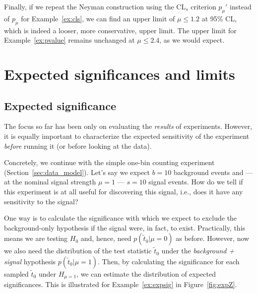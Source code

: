 Finally, if we repeat the Neyman construction using the CL$_s$ criterion $p_\mu'$ instead of $p_\mu$ for Example~\ref{ex:cls}, we can find an upper limit of $\mu \leq 1.2$ at 95\% CL, which is indeed a looser, more conservative, upper limit.
The upper limit for Example~\ref{ex:pvalue} remains unchanged at $\mu \leq 2.4$, as we would expect.


\chapter{Expected significances and limits}
\label{sec:expected}

\section{Expected significance}

The focus so far has been only on evaluating the \textit{results} of experiments.
However, it is equally important to characterize the expected sensitivity of the experiment \textit{before} running it (or before looking at the data).

\begin{example}
\label{ex:expsig}
Concretely, we continue with the simple one-bin counting experiment (Section~\ref{sec:data_model}).
Let's say we expect $b = 10$ background events and --- at the nominal signal strength $\mu = 1$ --- $s = 10$ signal events.
How do we tell if this experiment is at all useful for discovering this signal, i.e., does it have any sensitivity to the signal?
\end{example}

One way is to calculate the significance with which we expect to exclude the background-only hypothesis if the signal were, in fact, to exist.
Practically, this means we are testing $H_0$ and, hence, need $p(\tilde{t}_0|\mu = 0)$ as before. However, now we also need the distribution of the test statistic $\tilde{t}_0$ under the \textit{background + signal} hypothesis $p(\tilde{t}_0|\mu = 1)$.
Then, by calculating the significance for each sampled $\tilde{t}_0$ under $H_{\mu = 1}$, we can estimate the distribution of expected significances.
This is illustrated for Example~\ref{ex:expsig} in Figure~\ref{fig:expZ}.


